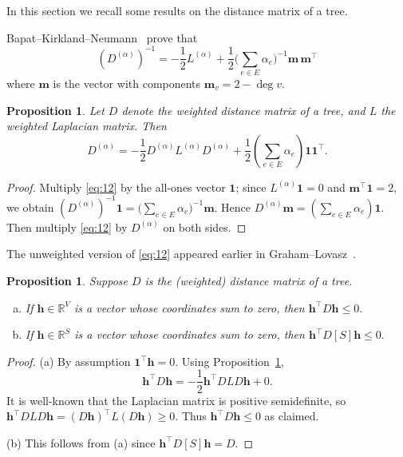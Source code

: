 \documentclass{amsart}
\newtheorem{prop}[thm]{Proposition}
\theoremstyle{definition}
\newcommand{\RR}{\mathbb{R}}
\newcommand{\bone}{\mathbf{1}}
\newcommand{\boldm}{\mathbf{m}}
\newcommand{\Da}{{D^{(\alpha)}}}
\newcommand{\La}{L^{(\alpha)}}
\newcommand{\tr}{\intercal}
\begin{document}
In this section we recall some results on the distance matrix of a tree.

Bapat--Kirkland--Neumann~\cite[Theorem 2.1]{bapat-kirkland-neumann} prove that
\begin{equation}
\label{eq:12}
	(\Da)^{-1} = - \frac12 \La + \frac12 \Big( \sum_{e \in E} \alpha_e\Big)^{-1} \boldm\, \boldm^\tr
\end{equation}
where $\boldm$ is the vector with components $\boldm_v = 2 - \deg v$.

\begin{prop}
\label{prop:dist-laplacian}
Let $D$ denote the weighted distance matrix of a tree, and $L$ the weighted Laplacian matrix. 
Then
\[
	\Da = - \frac{1}{2} \Da \La \Da + \frac{1}{2} \left( \sum_{e \in E} \alpha_e\right) \bone \bone^\tr .
\]
\end{prop}
\begin{proof}
Multiply \eqref{eq:12} by the all-ones vector $\bone$; since $\La \bone = 0$ and $\boldm^\tr \bone = 2$, we obtain $(\Da)^{-1} \bone = \Big( \sum_{e \in E} \alpha_e\Big)^{-1} \boldm$.
Hence $\Da \boldm = \left( \sum_{e \in E} \alpha_e \right) \bone$.
Then multiply \eqref{eq:12} by $\Da$ on both sides. 
\end{proof}
The unweighted version of \eqref{eq:12} appeared earlier in Graham--Lovasz~\cite[Lemma 1]{graham-lovasz}.

\begin{prop}
\label{prop:negdeg-hyperplane}
Suppose $D$ is the (weighted) distance matrix of a tree.
\begin{enumerate}[(a)]
\item
If $\mathbf{h} \in \RR^V$ is a vector whose coordinates sum to zero, then
$
	\mathbf{h}^\tr D \mathbf{h} \leq 0.
$

\item 
If $\mathbf{h} \in \RR^S$ is a vector whose coordinates sum to zero, then
$
	\mathbf{h}^\tr D[S] \mathbf{h} \leq 0.
$
\end{enumerate}
\end{prop}
\begin{proof}
(a)
By assumption $\bone^\tr \mathbf{h} = 0$.
Using Proposition~\ref{prop:dist-laplacian},
\[
	\mathbf{h}^\tr D\mathbf{h} = - \frac12 \mathbf{h}^\tr DLD \mathbf{h} + 0.
\]
It is well-known that the Laplacian matrix is positive semidefinite, so $\mathbf{h}^\tr DLD \mathbf{h} = (D \mathbf{h})^\tr L (D \mathbf{h}) \geq 0$.
Thus $\mathbf{h}^\tr D \mathbf{h} \leq 0$
as claimed.

(b)
This follows from (a) since $\mathbf{h}^\tr D[S] \mathbf{h} = D$.
\end{proof}
\end{document}
